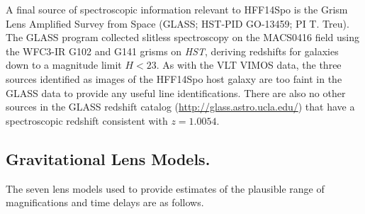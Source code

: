 \documentclass{article}
\providecommand\citep{\cite}
\def\HST{{\it HST}\xspace}
\def\spock{HFF14Spo\xspace}
\def\macs0416{MACS0416\xspace}
\begin{document}
A final source of spectroscopic information relevant to \spock is the
Grism Lens Amplified Survey from Space (GLASS; HST-PID
  GO-13459; PI T. Treu)\citep{Schmidt:2014,Treu:2015a}. The GLASS
program collected slitless spectroscopy on the \macs0416 field using
the WFC3-IR G102 and G141 grisms on \HST, deriving redshifts for
galaxies down to a magnitude limit $H<23$.  As with the VLT VIMOS
data, the three sources identified as images of the \spock host galaxy
are too faint in the GLASS data to provide any useful line
identifications.  There are also no other sources in the GLASS
redshift catalog (\url{http://glass.astro.ucla.edu/}) that
have a spectroscopic redshift consistent with $z=1.0054$.


\subsection{Gravitational Lens Models.}\label{sec:LensingModels}

The seven lens models used to provide estimates of the plausible range
of magnifications and time delays are as follows.
\end{document}
